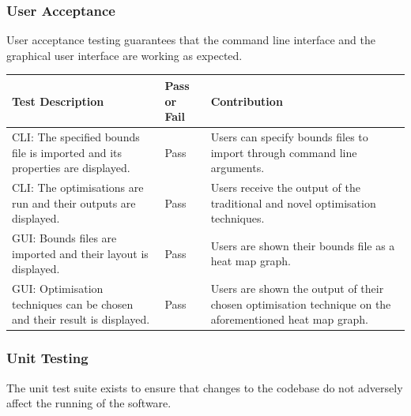 		\subsubsection{User Acceptance}
			\label{sec:software_acceptance}
			User acceptance testing guarantees that the command line interface and the graphical user interface are working as expected. \\
			\begin{center}
				\small
				\begin{tabular}{| p{5cm} | p{1.5cm} | p{5cm}|}
				\hline
				\textbf{Test Description} & \textbf{Pass or Fail} & \textbf{Contribution} \\
				\hline
				CLI: The specified bounds file is imported and its properties are displayed. & Pass & Users can specify bounds files to import through command line arguments. \\
				\hline
				CLI: The optimisations are run and their outputs are displayed. & Pass & Users receive the output of the traditional and novel optimisation techniques. \\
				\hline
				GUI: Bounds files are imported and their layout is displayed. & Pass & Users are shown their bounds file as a heat map graph. \\
				\hline
				GUI: Optimisation techniques can be chosen and their result is displayed. & Pass & Users are shown the output of their chosen optimisation technique on the aforementioned heat map graph. \\
				\hline
				\end{tabular}
			\end{center}
				
		\subsubsection{Unit Testing}
			\label{sec:software_unit}
			The unit test suite exists to ensure that changes to the codebase do not adversely affect the running of the software. \\
			\begin{center}
				\small
			\end{center}